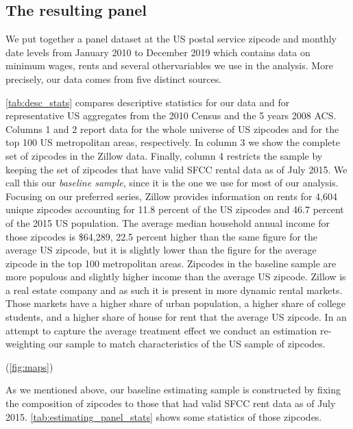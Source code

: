 \subsection{The resulting panel}


We put together a panel dataset at the US postal service zipcode and monthly date 
levels from January 2010 to December 2019 which contains data on minimum wages, rents 
and several othervariables we use in the analysis. More precisely, our data comes 
from five distinct sources.


\autoref{tab:desc_stats} compares descriptive statistics for our data and for representative 
US aggregates from the 2010 Census and the 5 years 2008 ACS. Columns 1 and 2 report data for the 
whole universe of US zipcodes and for the top 100 US metropolitan areas, respectively. In column 3 
we show the complete set of zipcodes in the Zillow data. Finally, column 4 restricts the sample by 
keeping the set of zipcodes that have valid SFCC rental data as of July 2015. We call this
our \textit{baseline sample}, since it is the one we use for most of our analysis. Focusing on our 
preferred series, Zillow provides information on rents for 4,604 unique zipcodes accounting for 
11.8 percent of the US zipcodes and 46.7 percent of the 2015 US population. The average median 
household annual income for those zipcodes is \$64,289, 22.5 percent higher than the same figure 
for the average US zipcode, but it is slightly lower than the figure for the average zipcode 
in the top 100 metropolitan areas. Zipcodes in the baseline sample are more populous and slightly 
higher income than the average US zipcode. Zillow is a real estate company and as such it is 
present in more dynamic rental markets. Those markets have a higher share of urban population, 
a higher share of college students, and a higher share of house for rent that the average US 
zipcode. In an attempt to capture the average treatment effect we conduct an estimation 
re-weighting our sample to match characteristics of the US sample of zipcodes.

(\autoref{fig:maps})

As we mentioned above, our baseline estimating sample is constructed by fixing the composition of 
zipcodes to those that had valid SFCC rent data as of July 2015. \autoref{tab:estimating_panel_stats}
shows some statistics of those zipcodes. %

